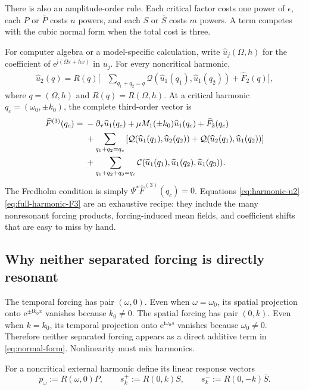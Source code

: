 \documentclass[11pt]{article}
\newcommand{\ii}{\mathrm{i}}
\newcommand{\ee}{\mathrm{e}}
\newcommand{\cQ}{\mathcal{Q}}
\newcommand{\cC}{\mathcal{C}}
\begin{document}
There is also an amplitude-order rule.  Each critical factor costs one power
of $\epsilon$, each $P$ or $\overline P$ costs $n$ powers, and each $S$ or
$\overline S$ costs $m$ powers.  A term competes with the cubic normal form
when the total cost is three.

For computer algebra or a model-specific calculation, write
$\widehat u_j(\Omega,h)$ for the coefficient of
$\ee^{\ii(\Omega s+hx)}$ in $u_j$.  For every noncritical harmonic,
\begin{align}
\widehat u_2(q)=R(q)\bigg[&
  \sum_{q_1+q_2=q}
  \cQ\!\left(\widehat u_1(q_1),\widehat u_1(q_2)\right)
  +\widehat F_2(q)\bigg],
\label{eq:harmonic-u2}
\end{align}
where $q=(\Omega,h)$ and $R(q)=R(\Omega,h)$.  At a critical harmonic
$q_c=(\omega_0,\pm k_0)$, the complete third-order vector is
\begin{align}
\widehat F^{(3)}(q_c)={}&
  -\partial_\tau\widehat u_1(q_c)
  +\mu M_1(\pm k_0)\widehat u_1(q_c)+\widehat F_3(q_c)
  \notag\\
&+\sum_{q_1+q_2=q_c}\left[
  \cQ(\widehat u_1(q_1),\widehat u_2(q_2))
 +\cQ(\widehat u_2(q_1),\widehat u_1(q_2))\right]
\notag\\
&+\sum_{q_1+q_2+q_3=q_c}
  \cC(\widehat u_1(q_1),\widehat u_1(q_2),
  \widehat u_1(q_3)).
\label{eq:full-harmonic-F3}
\end{align}
The Fredholm condition is simply $\Psi^*\widehat F^{(3)}(q_c)=0$.
Equations \eqref{eq:harmonic-u2}--\eqref{eq:full-harmonic-F3} are an exhaustive
recipe: they include the many nonresonant forcing products, forcing-induced
mean fields, and coefficient shifts that are easy to miss by hand.

\subsection{Why neither separated forcing is directly resonant}

The temporal forcing has pair $(\omega,0)$.  Even when $\omega=\omega_0$, its
spatial projection onto $\ee^{\pm\ii k_0x}$ vanishes because $k_0\ne0$.
The spatial forcing has pair $(0,k)$.  Even when $k=k_0$, its temporal
projection onto $\ee^{\ii\omega_0s}$ vanishes because $\omega_0\ne0$.
Therefore neither separated forcing appears as a direct additive term in
\eqref{eq:normal-form}.  Nonlinearity must mix harmonics.

For a noncritical external harmonic define its linear response vectors
\begin{equation}
  p_\omega:=R(\omega,0)P,
  \qquad
  s_k^+:=R(0,k)S,
  \qquad
  s_k^-:=R(0,-k)\overline S.
  \label{eq:forced-responses}
\end{equation}
\end{document}
